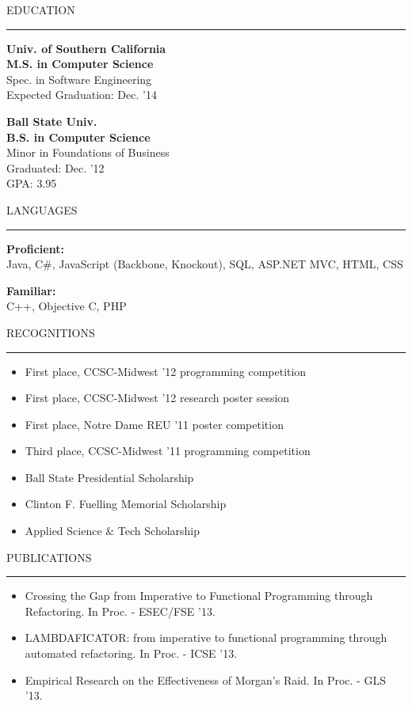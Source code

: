\documentclass[a4paper,10pt]{article}
\newcommand{\header}[1]
{
{\Large{\uppercase{#1}}}
\vspace{0.05in}
\hrule
\vspace{0.15in}
}
\newcommand{\spacer}{\vspace*{1\baselineskip}}
\newenvironment{details}
{\begin{itemize}[label=\scalebox{.5}{\ding{117}},leftmargin=0.15in]}
{\end{itemize}}
\begin{document}
\begin{minipage}[t]{0.35\textwidth}
\header{Education}

\textbf{Univ. of Southern California\\
M.S. in Computer Science\\}
Spec. in Software Engineering\\
Expected Graduation: Dec. '14
\spacer

\textbf{Ball State Univ.\\
B.S. in Computer Science\\}
Minor in Foundations of Business\\
Graduated: Dec. '12\\
GPA: 3.95

\spacer

\header{Languages}

\textbf{Proficient:}\\
Java, C\#, JavaScript (Backbone, Knockout), SQL, ASP.NET MVC, HTML, CSS

\spacer

\textbf{Familiar:}\\
C++, Objective C, PHP

\spacer

\header{Recognitions}

\vspace{-0.1in}
\begin{details}
  \item First place, CCSC-Midwest '12 programming competition
  \item First place, CCSC-Midwest '12 research poster session
  \item First place, Notre Dame REU '11 poster competition
  \item Third place, CCSC-Midwest '11 programming competition
  \item Ball State Presidential Scholarship
  \item Clinton F. Fuelling Memorial Scholarship
  \item Applied Science \& Tech Scholarship
\end{details}
\vspace{-0.1in}

\spacer

\header{Publications}

\vspace{-0.1in}
\begin{details}
  \item
  Crossing the Gap from Imperative to Functional Programming through Refactoring.
  In Proc. - ESEC/FSE '13.
  
  \item 
  LAMBDAFICATOR: from imperative to functional programming through automated refactoring. 
  In Proc. - ICSE '13.
  
  \item
  Empirical Research on the Effectiveness of Morgan's Raid.
  In Proc. - GLS '13.
\end{details}
\vspace{-0.1in}

\end{minipage}
\end{document}
